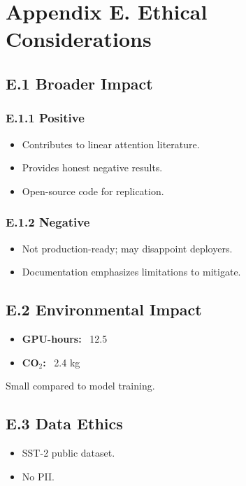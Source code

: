 
\section{Appendix E. Ethical Considerations}

\subsection{E.1 Broader Impact}

\subsubsection{E.1.1 Positive}

\begin{itemize}
\item Contributes to linear attention literature.
\item Provides honest negative results.
\item Open-source code for replication.

\end{itemize}
\subsubsection{E.1.2 Negative}

\begin{itemize}
\item Not production-ready; may disappoint deployers.
\item Documentation emphasizes limitations to mitigate.

\end{itemize}
\subsection{E.2 Environmental Impact}

\begin{itemize}
\item \textbf{GPU-hours:} ~12.5
\item \textbf{CO$_2$:} ~2.4 kg

\end{itemize}
Small compared to model training.

\subsection{E.3 Data Ethics}

\begin{itemize}
\item SST-2 public dataset.
\item No PII.

\end{itemize}
